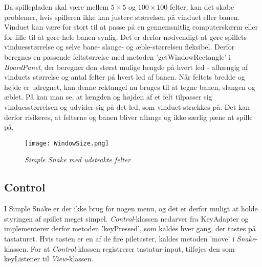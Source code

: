 Da spillepladen skal være mellem $5\times 5$ og $100\times 100$ felter, kan det skabe problemer, hvis spilleren ikke kan justere størrelsen på vinduet eller banen. Vinduet kan være for stort til at passe på en gennemsnitlig computerskærm eller for lille til at gøre hele banen synlig. Det er derfor nødvendigt at gøre spillets vinduesstørrelse og selve bane- slange- og æble-størrelsen fleksibel. Derfor beregnes en passende feltstørrelse med metoden 'getWindowRectangle' i \textit{BoardPanel}, der beregner den størst mulige længde på hvert led - afhængig af vinduets størrelse og antal felter på hvert led af banen. Når feltets bredde og højde er udregnet, kan denne rektangel nu bruges til at tegne banen, slangen og æblet.
På  kan man se, at længden og højden af et felt tilpasser sig vinduesstørrelsen og udvider sig på det led, som vinduet strækkes på. Det kan derfor risikeres, at felterne og banen bliver aflange og ikke særlig pæne at spille på.

\begin{figure}[h]
	\centering
	\texttt{[image: WindowSize.png]}
	\caption{\textit{Simple Snake med udstrakte felter}}
\end{figure}

\subsection{Control}
I Simple Snake er der ikke brug for nogen menu, og det er derfor muligt at holde styringen af spillet meget simpel. \textit{Control}-klassen nedarver fra KeyAdapter og implementerer derfor metoden 'keyPressed', som kaldes hver gang, der tastes på tastaturet. Hvis tasten er en af de fire piletaster, kaldes metoden 'move' i \textit{Snake}-klassen. For at \textit{Control}-klassen registrerer tastatur-input, tilføjes den som keyListener til \textit{View}-klassen.